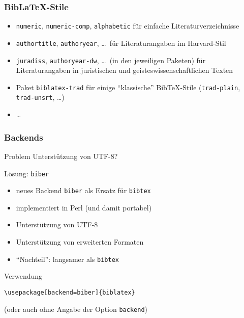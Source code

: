 \begin{frame}
  \frametitle{Bib\LaTeX-Stile}
  \onslide<+->

  \begin{itemize}
  \item<+-> \texttt{numeric}, \texttt{numeric-comp}, \texttt{alphabetic} für
    einfache Literaturverzeichnisse
  \item<+-> \texttt{authortitle}, \texttt{authoryear}, \dots\ für
    Literaturangaben im Harvard-Stil
  \item<+-> \texttt{juradiss}, \texttt{authoryear-dw}, \dots\ (in den jeweiligen
    Paketen) für Literaturangaben in juristischen und geisteswissenschaftlichen
    Texten
  \item<+-> Paket \texttt{biblatex-trad} für einige \enquote{klassische}
    Bib\TeX-Stile (\texttt{trad-plain}, \texttt{trad-unsrt}, \dots)
  \item<+-> \dots
  \end{itemize}

\end{frame}

\begin{frame}[fragile]
  \frametitle{Backends}
  \onslide<+->

  \begin{block}{Problem}
    Unterstützung von UTF-8?
  \end{block}

  \onslide<+->

  \begin{block}{Lösung: \texttt{biber}}
    \begin{itemize}
    \item<+-> neues Backend \texttt{biber} als Ersatz für \texttt{bibtex}
    \item<+-> implementiert in Perl (und damit portabel)
    \item<+-> Unterstützung von UTF-8
    \item<+-> Unterstützung von erweiterten Formaten
    \item<+-> \enquote{Nachteil}: langsamer als \texttt{bibtex}
    \end{itemize}
  \end{block}

  \onslide<+->

  \begin{block}{Verwendung}
\begin{lstlisting}
\usepackage[backend=biber]{biblatex}
\end{lstlisting}
    (oder auch ohne Angabe der Option \texttt{backend})
  \end{block}

\end{frame}

